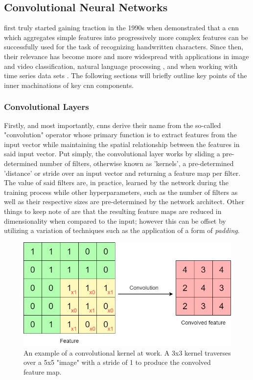 \subsection{Convolutional Neural Networks}
\label{subsec:Background-Information:Convolutional-Neural-Networks}
 first truly started gaining traction in the 1990s when \citet{LeCun} demonstrated that a \gls{cnn} which aggregates simple features into progressively more complex features can be successfully used for the task of recognizing handwritten characters. Since then, their relevance has become more and more widespread with applications in image and video classification, natural language processing \cite{Collobert}, and when working with time series data sets \cite{Tsantekidis}. The following sections will briefly outline key points of the inner machinations of key \gls{cnn} components.

\subsubsection{Convolutional Layers}
\label{subsubsec:Background-Information:Convolutional-Neural-Networks:Convolutional-Layers}
Firstly, and most importantly, \glspl{cnn} derive their name from the so-called "convolution" operator whose primary function is to extract features from the input vector while maintaining the spatial relationship between the features in said input vector. Put simply, the convolutional layer works by sliding a pre-determined number of filters, otherwise known as 'kernels', a pre-determined 'distance' or stride over an input vector and returning a feature map per filter. The value of said filters are, in practice, learned by the network during the training process while other hyperparameters, such as the number of filters as well as their respective sizes are pre-determined by the network architect. Other things to keep note of are that the resulting feature maps are reduced in dimensionality when compared to the input; however this can be offset by utilizing a variation of techniques such as the application of a form of \textit{padding}.

\begin{figure}[hbt!]
    \centering
    \includegraphics[width=\textwidth]{Images/Chapter 3/CNN/Convolution-Illustration.png}
    \caption{An example of a convolutional kernel at work. A 3x3 kernel traverses over a 5x5 "image" with a stride of 1 to produce the convolved feature map.}
    \label{fig:Convolution-Illustration}
\end{figure}

